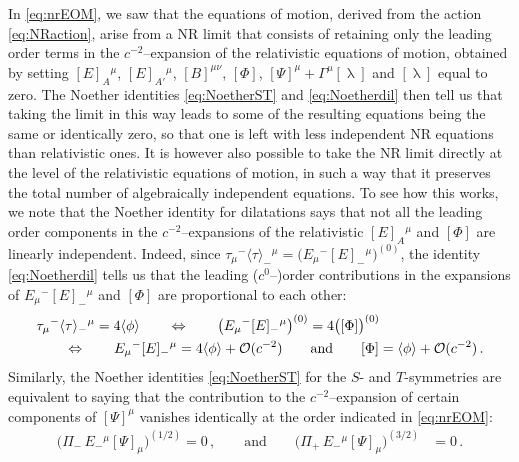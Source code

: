 \documentclass[a4paper,10pt,openany]{article}
\begin{document}
	In \eqref{eq:nrEOM}, we saw that the equations of motion, derived from the action \eqref{eq:NRaction}, arise from a NR limit that consists of retaining only the leading order terms in the $c^{-2}$--expansion of the relativistic equations of motion, obtained by setting $[E]_A{}^\mu$, $[E]_{A'}{}^\mu$, $[B]^{\mu\nu}$, $[\Phi]$, $[\Psi]^\mu + \Gamma^\mu [\uplambda]$ and $[\uplambda]$ equal to zero. The Noether identities \eqref{eq:NoetherST} and \eqref{eq:Noetherdil} then tell us that taking the limit in this way leads to some of the resulting equations being the same or identically zero, so that one is left with less independent NR equations than relativistic ones. It is however also possible to take the NR limit directly at the level of the relativistic equations of motion, in such a way that it preserves the total number of algebraically independent equations. To see how this works, we note that the Noether identity for dilatations says that not all the leading order components in the $c^{-2}$--expansions of the relativistic $[E]_A{}^\mu$ and $[\Phi]$ are linearly independent. Indeed, since $\tau_\mu{}^- \langle \tau \rangle_-{}^\mu = \big(E_\mu{}^- [E]_-{}^\mu\big)^{(0)}$, the identity \eqref{eq:Noetherdil} tells us that the leading ($c^0$--)order contributions in the expansions of $E_\mu{}^- [E]_-{}^\mu$ and $[\Phi]$ are proportional to each other:
	\begin{align} \label{eq:rewriteNoetherdil}
		& \tau_\mu{}^- \langle \tau \rangle_-{}^\mu = 4 \langle \phi \rangle \qquad \Leftrightarrow  \qquad \big(E_\mu{}^- [E]_-{}^\mu\big)^{(0)}= 4 \big([\Phi]\big)^{(0)} \notag \\
		& \qquad \Leftrightarrow \qquad E_\mu{}^- [E]_-{}^\mu = 4 \langle \phi \rangle + \mathcal{O}(c^{-2}) \qquad \text{and} \qquad [\Phi] = \langle \phi \rangle + \mathcal{O}(c^{-2}) \,.
	\end{align}
	Similarly, the Noether identities \eqref{eq:NoetherST} for the $S$- and $T$-symmetries are equivalent to saying that the contribution to the $c^{-2}$--expansion of certain components of $[\Psi]^\mu$ vanishes identically at the order indicated in \eqref{eq:nrEOM}:
	\begin{align} \label{eq:rewriteNoetherST}
		\big(\Pi_-\,E_-{}^\mu [\Psi]_\mu\big)^{(1/2)} = 0\,,\qquad\mathrm{and}\qquad \big(\Pi_+\,E_-{}^\mu [\Psi]_\mu\big)^{(3/2)} &= 0\,.
	\end{align}
\end{document}
